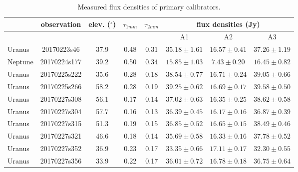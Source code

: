 \begin{table}
\centering
\label{tab:fluxAp}
\caption[]{Measured flux densities of primary calibrators.}
\begin{tabular}{|l|c|c|c|c|c|c|c|}
\hline
\multicolumn{1}{|c}{} & \multicolumn{1}{|c}{ observation}  & \multicolumn{1}{|c}{elev. ($^{\circ}$) } &  \multicolumn{1}{|c}{$\tau_{1mm} $}  &  \multicolumn{1}{|c}{$\tau_{2mm} $ } & \multicolumn{3}{|c|}{flux densities (Jy)}  \\
\hline
&                   &             &                &                 &    A1              &  A2   &   A3    \\
\hline
 Uranus   & 20170223s46  &  37.9 & 0.48 & 0.31 & $     35.18 \pm        1.61$  & $     16.57 \pm        0.41$ & $     37.26 \pm       1.19$  \\
 Neptune  & 20170224s177 &  39.2 & 0.50 & 0.34 & $     15.85 \pm        1.03$  & $      7.43 \pm        0.20$ & $     16.45 \pm       0.82$  \\
 Uranus   & 20170225s222 &  35.6 & 0.28 & 0.18 & $     38.54 \pm        0.77$  & $     16.71 \pm        0.24$ & $     39.05 \pm       0.66$  \\
 Uranus   & 20170225s266 &  58.2 & 0.28 & 0.19 & $     39.25 \pm        0.62$  & $     16.69 \pm        0.17$ & $     39.58 \pm       0.50$  \\
 Uranus   & 20170227s308 &  56.1 & 0.17 & 0.14 & $     37.02 \pm        0.63$  & $     16.35 \pm        0.25$ & $     38.62 \pm       0.58$  \\
 Uranus   & 20170227s304 &  57.7 & 0.16 & 0.13 & $     36.39 \pm        0.45$  & $     16.17 \pm        0.16$ & $     36.87 \pm       0.39$  \\
 Uranus   & 20170227s315 &  51.3 & 0.19 & 0.15 & $     36.85 \pm        0.52$  & $     16.65 \pm        0.15$ & $     38.49 \pm       0.46$  \\
 Uranus   & 20170227s321 &  46.6 & 0.18 & 0.14 & $     35.69 \pm        0.58$  & $     16.33 \pm        0.16$ & $     37.78 \pm       0.52$  \\
 Uranus   & 20170227s352 &  36.9 & 0.23 & 0.17 & $     33.35 \pm        0.66$  & $     17.11 \pm        0.17$ & $     32.30 \pm       0.55$  \\
 Uranus   & 20170227s356 &  33.9 & 0.22 & 0.17 & $     36.01 \pm        0.72$  & $     16.78 \pm        0.18$ & $     36.75 \pm       0.64$  \\
\hline
\end{tabular}
\end{table}



